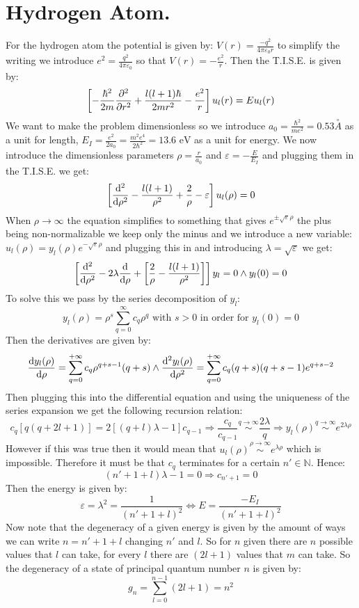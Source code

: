 \documentclass[10pt,a4paper]{book}
\begin{document}
\section{Hydrogen Atom.}
For the hydrogen atom the potential is given by: $V(r) = \frac{-q^2}{4\pi \varepsilon_0 r}$ to simplify the writing we introduce $e^2 = \frac{q^2}{4 \pi \varepsilon_0}$ so that $V(r) = - \frac{e^2}{r}$. Then the T.I.S.E. is given by:
\[
\left[ -\frac{\hbar^2}{2m} \pdv[2]{}{r} + \frac{l ( l + 1) \hbar}{2 m r^2} - \frac{e^2}{r} \right] u_l(r) = E u_l(r)
\]
We want to make the problem dimensionless so we introduce $a_0 = \frac{\hbar^2}{m e^2}= 0.53 \stackrel{\circ}{A}$ as a unit for length, $E_I = \frac{e^2}{2 a_0} = \frac{m^2 e^4}{2 \hbar^2} = 13.6 \text{ eV} $ as a unit for energy. We now introduce the dimensionless parameters $\rho = \frac{r}{a_0}$ and $\varepsilon = -\frac{E}{E_I}$ and plugging them in the T.I.S.E. we get:
\[
\left[ \dv[2]{}{\rho} - \frac{l(l+1)}{\rho^2} + \frac{2}{\rho} - \varepsilon \right] u_l(\rho) = 0
\]
When $\rho \to \infty$ the equation simplifies to something that gives $e^{\pm \sqrt{\varepsilon} \rho}$ the plus being non-normalizable we keep only the minus and we introduce a new variable: $u_l(\rho) = y_l(\rho) e^{-\sqrt{\varepsilon} \rho}$ and plugging this in and introducing $\lambda = \sqrt{\varepsilon}$ we get:
\[
\left[ \dv[2]{}{\rho} - 2\lambda \dv{}{\rho} + \left[\frac{2}{\rho} - \frac{l (l + 1)}{\rho^2} \right] \right] y_l = 0 \land y_l(0) = 0
\]
To solve this we pass by the series decomposition of $y_l$:
\[
y_l(\rho) = \rho^s \sum_{q = 0}^{\infty} c_q \rho^q \text{ with } s > 0 \text{ in order for } y_l(0) = 0
\]
Then the derivatives are given by:
\[
\dv{y_l(\rho)}{\rho} = \sum_{q = 0}^{+\infty} c_q \rho^{q + s - 1} (q + s) \land \dv[2]{y_l(\rho)}{\rho} = \sum_{q = 0}^{+\infty} c_q (q + s) (q + s - 1) e^{q + s - 2}
\]
Then plugging this into the differential equation and using the uniqueness of the series expansion we get the following recursion relation:
\[
c_q \left[ q (q + 2l + 1) \right] = 2 \left[(q+l)\lambda - 1 \right] c_{q-1} \Rightarrow \frac{c_q}{c_{q-1}} \stackrel{q \to \infty}{\sim} \frac{2\lambda}{q} \Rightarrow y_l(\rho) \stackrel{q \to \infty}{\sim} e^{2\lambda \rho}
\]
However if this was true then it would mean that $u_l(\rho) \stackrel{\rho \to \infty}{\sim} e^{\lambda \rho}$ which is impossible. Therefore it must be that $c_q$ terminates for a certain $n' \in \mathbb{N}$. Hence:
\[
(n' + 1 + l) \lambda - 1 = 0 \Rightarrow c_{n'+1} = 0
\]
Then the energy is given by:
\[
\varepsilon = \lambda^2 = \frac{1}{(n' + 1 + l)^2} \Leftrightarrow E = \frac{-E_I}{(n' + 1 + l)^2}
\]
Now note that the degeneracy of a given energy is given by the amount of ways we can write $n = n' + 1 + l$ changing $n'$ and $l$. So for $n$ given there are $n$ possible values that $l$ can take, for every $l$ there are $(2l +1)$ values that $m$ can take. So the degeneracy of a state of principal quantum number $n$ is given by:
\[
g_n = \sum_{l = 0}^{n-1} (2l + 1) = n^2
\]
\end{document}
